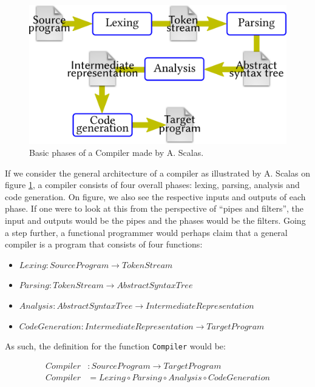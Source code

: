 \begin{figure}[H]
\centering
\includegraphics[width=\textwidth]{Pictures/basic_compiler_phases.png}
\caption{Basic phases of a Compiler made by A. Scalas.}
\label{fig:compiler_phases}
\end{figure}

If we consider the general architecture of a compiler as illustrated by A. Scalas on figure \ref{fig:compiler_phases}, a compiler consists of four overall phases:
lexing, parsing, analysis and code generation. On figure, we also see the respective inputs and outputs of each phase. If one were to
look at this from the perspective of ``pipes and filters'', the input and outputs would be the pipes and the phases would be the filters.
Going a step further, a functional programmer would perhaps claim that a general compiler is a program that consists of four functions:

\begin{itemize}
  \item $Lexing : SourceProgram \rightarrow TokenStream$
  \item $Parsing : TokenStream \rightarrow AbstractSyntaxTree$
  \item $Analysis : AbstractSyntaxTree \rightarrow IntermediateRepresentation$
  \item $CodeGeneration : IntermediateRepresentation \rightarrow TargetProgram$
\end{itemize}

As such, the definition for the function \texttt{Compiler} would be:

\begin{align*}
  Compiler &: SourceProgram \rightarrow TargetProgram \\
  Compiler &= Lexing \circ Parsing \circ Analysis \circ CodeGeneration
\end{align*}

